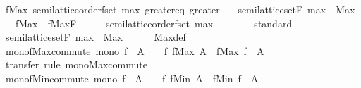 \begin{isabellebody}
\isanewline
{}\isamarkupfalse%
%
\endisatagproof
{\isafoldproof}%
%
\isadelimproof
\isanewline
%
\endisadelimproof
\isanewline
{}\isamarkupfalse%
\ fMax{\isacharcolon}\ semilattice{\isacharunderscore}order{\isacharunderscore}fset\ max\ greater{\isacharunderscore}eq\ greater\isanewline
\ \ \ {\isachardoublequoteopen}semilattice{\isacharunderscore}set{\isachardot}F\ max\ {\isacharequal}\ Max{\isachardoublequoteclose}\isanewline
\ \ \ fMax\ {\isacharequal}\ fMax{\isachardot}F\isanewline
%
\isadelimproof
%
\endisadelimproof
%
\isatagproof
{}\isamarkupfalse%
\ {\isacharminus}\isanewline
\ \ \isamarkupfalse%
\ {\isachardoublequoteopen}semilattice{\isacharunderscore}order{\isacharunderscore}fset\ max\ {\isacharparenleft}{\isasymge}{\isacharparenright}\ {\isacharparenleft}{\isachargreater}{\isacharparenright}{\isachardoublequoteclose}\isanewline
\ \ \ \ \isamarkupfalse%
\ standard\isanewline
\isanewline
\ \ \isamarkupfalse%
\ {\isachardoublequoteopen}semilattice{\isacharunderscore}set{\isachardot}F\ max\ {\isacharequal}\ Max{\isachardoublequoteclose}\isanewline
\ \ \ \ \isamarkupfalse%
\ Max{\isacharunderscore}def\ \isacommand{{\isachardot}{\isachardot}}\isamarkupfalse%
\isanewline
{}\isamarkupfalse%
%
\endisatagproof
{\isafoldproof}%
%
\isadelimproof
\isanewline
%
\endisadelimproof
\isanewline
{}\isamarkupfalse%
\isanewline
\isanewline
{}\isamarkupfalse%
\ mono{\isacharunderscore}fMax{\isacharunderscore}commute{\isacharcolon}\ {\isachardoublequoteopen}mono\ f\ {\isasymLongrightarrow}\ A\ {\isasymnoteq}\ {\isacharbraceleft}{\isacharbar}{\isacharbar}{\isacharbraceright}\ {\isasymLongrightarrow}\ f\ {\isacharparenleft}fMax\ A{\isacharparenright}\ {\isacharequal}\ fMax\ {\isacharparenleft}f\ {\isacharbar}{\isacharbackquote}{\isacharbar}\ A{\isacharparenright}{\isachardoublequoteclose}\isanewline
%
\isadelimproof
\ \ %
\endisadelimproof
%
\isatagproof
{}\isamarkupfalse%
\ transfer\ {\isacharparenleft}rule\ mono{\isacharunderscore}Max{\isacharunderscore}commute{\isacharparenright}%
\endisatagproof
{\isafoldproof}%
%
\isadelimproof
\isanewline
%
\endisadelimproof
\isanewline
{}\isamarkupfalse%
\ mono{\isacharunderscore}fMin{\isacharunderscore}commute{\isacharcolon}\ {\isachardoublequoteopen}mono\ f\ {\isasymLongrightarrow}\ A\ {\isasymnoteq}\ {\isacharbraceleft}{\isacharbar}{\isacharbar}{\isacharbraceright}\ {\isasymLongrightarrow}\ f\ {\isacharparenleft}fMin\ A{\isacharparenright}\ {\isacharequal}\ fMin\ {\isacharparenleft}f\ {\isacharbar}{\isacharbackquote}{\isacharbar}\ A{\isacharparenright}{\isachardoublequoteclose}\isanewline

\end{isabellebody}
